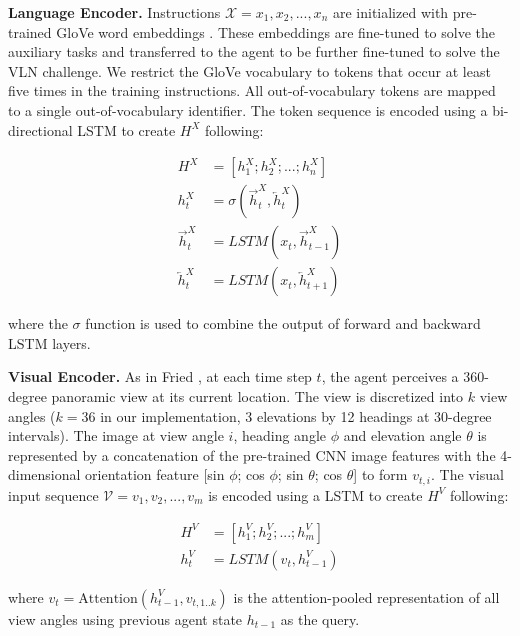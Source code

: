 \documentclass[10pt,twocolumn,letterpaper]{article}
\begin{document}
\textbf{Language Encoder.} 
Instructions $\mathcal{X}={x_1, x_2, ..., x_n}$ are initialized with pre-trained GloVe word embeddings \cite{Pennington:2014:GloVe}. These embeddings are fine-tuned to solve the auxiliary tasks and transferred to the agent to be further fine-tuned to solve the VLN challenge. We restrict the GloVe vocabulary to tokens that occur at least five times in the training instructions. All out-of-vocabulary tokens are mapped to a single out-of-vocabulary identifier. The token sequence is encoded using a bi-directional LSTM \cite{Schuster1997BidirectionalRN} to create $H^X$ following:

\begin{small}
\begin{align}
    H^X &= [h_1^X; h_2^X; ...; h_n^X]  \\
    h_t^X &= \sigma(\overrightarrow{h}_t^X, \overleftarrow{h}_t^X)  \\
    \overrightarrow{h}_t^X &= LSTM(x_t, \overrightarrow{h}_{t-1}^X)  \\
    \overleftarrow{h}_t^X &= LSTM(x_t, \overleftarrow{h}_{t+1}^X)
\end{align}
\end{small}

\noindent
where the $\sigma$ function is used to combine the output of forward and backward LSTM layers.

\textbf{Visual Encoder.}
As in Fried \etal \cite{Fried:2018:Speaker}, at each time step $t$, the agent perceives a 360-degree panoramic view at its current location. The view is discretized into $k$ view angles ($k=36$ in our implementation, 3 elevations by 12 headings at 30-degree intervals).
The image at view angle $i$, heading angle $\phi$ and elevation angle $\theta$ is represented by a concatenation of the pre-trained CNN image features with the 4-dimensional orientation feature [sin $\phi$; cos $\phi$; sin $\theta$; cos $\theta$] to form $v_{t,i}$.
The visual input sequence $\mathcal{V}={v_1, v_2, ..., v_m}$ is encoded using a LSTM to create $H^V$ following:


\begin{small}
\begin{align}
    H^V &= [h_1^V; h_2^V; ...; h_m^V]  \\
    h_t^V &= LSTM(v_t, h_{t-1}^V)
\end{align}
\end{small}

\noindent
where $v_t=\text{Attention}(h_{t-1}^V, v_{t,1..k})$ is the attention-pooled representation of all view angles using previous agent state $h_{t-1}$ as the query.
\end{document}
